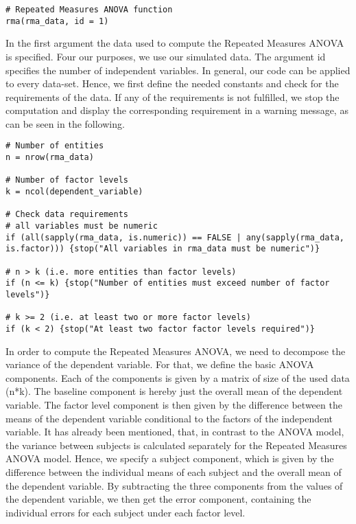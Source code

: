 \documentclass[11pt]{article}
\begin{document}
\begin{lstlisting}
# Repeated Measures ANOVA function
rma(rma_data, id = 1)					
\end{lstlisting}
					
					In the first argument the data used to compute the Repeated Measures ANOVA is specified. Four our purposes, we use our simulated data. The argument id specifies the number of independent variables. In general, our code can be applied to every data-set. Hence, we first define the needed constants and check for the requirements of the data. If any of the requirements is not fulfilled, we stop the computation and display the corresponding requirement in a warning message, as can be seen in the following.\\
			
\begin{lstlisting}
# Number of entities
n = nrow(rma_data)
    
# Number of factor levels
k = ncol(dependent_variable)

# Check data requirements
# all variables must be numeric
if (all(sapply(rma_data, is.numeric)) == FALSE | any(sapply(rma_data, is.factor))) {stop("All variables in rma_data must be numeric")}
    
# n > k (i.e. more entities than factor levels)
if (n <= k) {stop("Number of entities must exceed number of factor levels")}
    
# k >= 2 (i.e. at least two or more factor levels)
if (k < 2) {stop("At least two factor factor levels required")}
\end{lstlisting}   
    
					In order to compute the Repeated Measures ANOVA, we need to decompose the variance of the dependent variable. For that, we define the basic ANOVA components. Each of the components is given by a matrix of size of the used data (n*k). The baseline component is hereby just the overall mean of the dependent variable. The factor level component is then given by the difference between the means of the dependent variable conditional to the factors of the independent variable. It has already been mentioned, that, in contrast to the ANOVA model, the variance between subjects is calculated separately for the Repeated Measures ANOVA model. Hence, we specify a subject component, which is given by the difference between the individual means of each subject and the overall mean of the dependent variable. By subtracting the three components from the values of the dependent variable, we then get the error component, containing the individual errors for each subject under each factor level.\\
					
\end{document}

